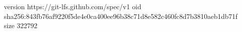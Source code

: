 version https://git-lfs.github.com/spec/v1
oid sha256:843fb76af9220f5de4e0ca400ee96b38c71d8e582c460fc8d7b3810aeb1db71f
size 322792
